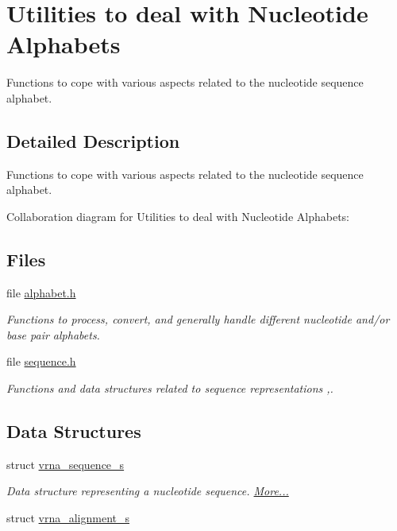 \hypertarget{group__alphabet__utils}{}\section{Utilities to deal with Nucleotide Alphabets}
\label{group__alphabet__utils}


Functions to cope with various aspects related to the nucleotide sequence alphabet.  




\subsection{Detailed Description}
Functions to cope with various aspects related to the nucleotide sequence alphabet. 

Collaboration diagram for Utilities to deal with Nucleotide Alphabets\+:
\subsection*{Files}
\begin{DoxyCompactItemize}
\item 
file \mbox{\hyperlink{alphabet_8h}{alphabet.\+h}}
\begin{DoxyCompactList}\small\item\em Functions to process, convert, and generally handle different nucleotide and/or base pair alphabets. \end{DoxyCompactList}\item 
file \mbox{\hyperlink{sequence_8h}{sequence.\+h}}
\begin{DoxyCompactList}\small\item\em Functions and data structures related to sequence representations ,. \end{DoxyCompactList}\end{DoxyCompactItemize}
\subsection*{Data Structures}
\begin{DoxyCompactItemize}
\item 
struct \mbox{\hyperlink{group__alphabet__utils_structvrna__sequence__s}{vrna\+\_\+sequence\+\_\+s}}
\begin{DoxyCompactList}\small\item\em Data structure representing a nucleotide sequence.  \mbox{\hyperlink{group__alphabet__utils_structvrna__sequence__s}{More...}}\end{DoxyCompactList}\item 
struct \mbox{\hyperlink{group__alphabet__utils_structvrna__alignment__s}{vrna\+\_\+alignment\+\_\+s}}
\end{DoxyCompactItemize}
